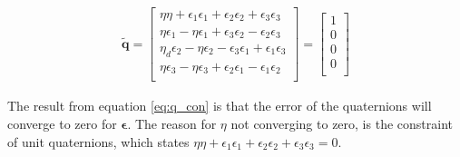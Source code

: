 \begin{equation}
    \begin{aligned}
    \tilde{\boldsymbol{q}}
    =
    \begin{bmatrix}
    \eta \eta + \epsilon_{1} \epsilon_1 + \epsilon_{2} \epsilon_2 + \epsilon_{3} \epsilon_3 \\
    \eta \epsilon_1 - \eta \epsilon_{1} + \epsilon_{3} \epsilon_{2} - \epsilon_{2} \epsilon_{3} \\
    \eta_d \epsilon_2 - \eta \epsilon_{2} - \epsilon_{3} \epsilon_{1} + \epsilon_{1} \epsilon_{3} \\
    \eta \epsilon_3 - \eta \epsilon_{3} + \epsilon_{2} \epsilon_{1} - \epsilon_{1} \epsilon_{2} \\
    \end{bmatrix}
    = 
    \begin{bmatrix}
    1 \\
    0\\
    0 \\
    0 \\
    \end{bmatrix}
    \label{eq:q_con}
    \end{aligned}
\end{equation}

The result from equation \eqref{eq:q_con} is that the error of the quaternions will converge to zero for $\boldsymbol{\epsilon}$. The reason for $\eta$ not converging to zero, is the constraint of unit quaternions, which states $\eta \eta + \epsilon_1 \epsilon_1 + \epsilon_2 \epsilon_2 + \epsilon_3 \epsilon_3 = 0$. 




